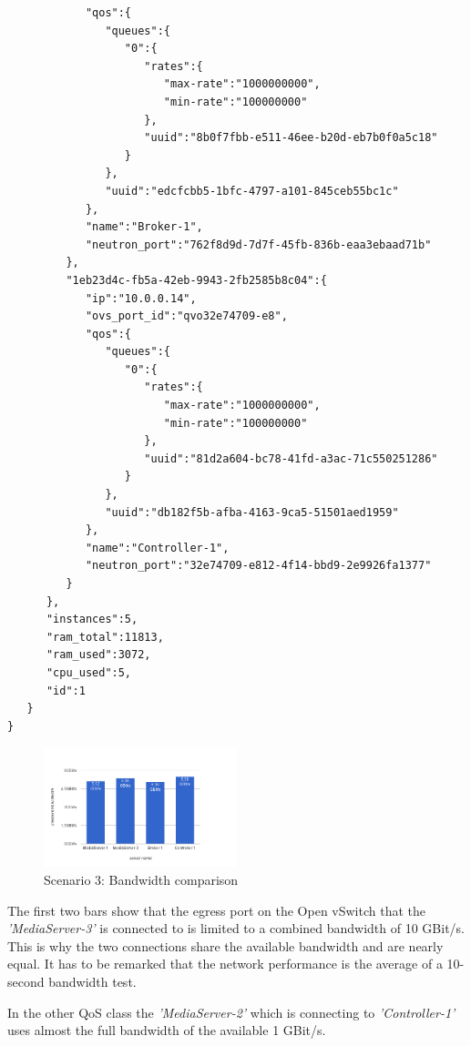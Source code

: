\begin{lstlisting}
            "qos":{  
               "queues":{  
                  "0":{  
                     "rates":{  
                        "max-rate":"1000000000",
                        "min-rate":"100000000"
                     },
                     "uuid":"8b0f7fbb-e511-46ee-b20d-eb7b0f0a5c18"
                  }
               },
               "uuid":"edcfcbb5-1bfc-4797-a101-845ceb55bc1c"
            },
            "name":"Broker-1",
            "neutron_port":"762f8d9d-7d7f-45fb-836b-eaa3ebaad71b"
         },
         "1eb23d4c-fb5a-42eb-9943-2fb2585b8c04":{  
            "ip":"10.0.0.14",
            "ovs_port_id":"qvo32e74709-e8",
            "qos":{  
               "queues":{  
                  "0":{  
                     "rates":{  
                        "max-rate":"1000000000",
                        "min-rate":"100000000"
                     },
                     "uuid":"81d2a604-bc78-41fd-a3ac-71c550251286"
                  }
               },
               "uuid":"db182f5b-afba-4163-9ca5-51501aed1959"
            },
            "name":"Controller-1",
            "neutron_port":"32e74709-e812-4f14-bbd9-2e9926fa1377"
         }
      },
      "instances":5,
      "ram_total":11813,
      "ram_used":3072,
      "cpu_used":5,
      "id":1
   }
}
\end{lstlisting}

\begin{figure}[H]
\centering

\includegraphics[width=0.5\textwidth]{images/evaluation/testbed_scenario2_bw}

\caption{Scenario 3: Bandwidth comparison}
\end{figure}

The first two bars show that the egress port on the Open vSwitch that the \textit{'MediaServer-3'} is connected to is limited to a combined bandwidth of 10 GBit/s. This is why the two connections share the available bandwidth and are nearly equal. It has to be remarked that the network performance is the average of a 10-second bandwidth test.

In the other QoS class the \textit{'MediaServer-2'} which is connecting to \textit{'Controller-1'} uses almost the full bandwidth of the available 1 GBit/s.

